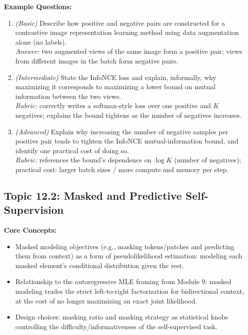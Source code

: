\documentclass[11pt]{article}
\begin{document}
\textbf{Example Questions:}
\begin{enumerate}
  \item \textit{(Basic)} Describe how positive and negative pairs are constructed for a contrastive image representation learning method using data augmentation alone (no labels). \\
  \textit{Answer:} two augmented views of the same image form a positive pair; views from different images in the batch form negative pairs.
  \item \textit{(Intermediate)} State the InfoNCE loss and explain, informally, why maximizing it corresponds to maximizing a lower bound on mutual information between the two views. \\
  \textit{Rubric:} correctly writes a softmax-style loss over one positive and $K$ negatives; explains the bound tightens as the number of negatives increases.
  \item \textit{(Advanced)} Explain why increasing the number of negative samples per positive pair tends to tighten the InfoNCE mutual-information bound, and identify one practical cost of doing so. \\
  \textit{Rubric:} references the bound's dependence on $\log K$ (number of negatives); practical cost: larger batch sizes / more compute and memory per step.
\end{enumerate}

\subsection{Topic 12.2: Masked and Predictive Self-Supervision}

\textbf{Core Concepts:}
\begin{itemize}
  \item Masked modeling objectives (e.g., masking tokens/patches and predicting them from context) as a form of pseudolikelihood estimation: modeling each masked element's conditional distribution given the rest.
  \item Relationship to the autoregressive MLE framing from Module 9: masked modeling trades the strict left-to-right factorization for bidirectional context, at the cost of no longer maximizing an exact joint likelihood.
  \item Design choices: masking ratio and masking strategy as statistical knobs controlling the difficulty/informativeness of the self-supervised task.
\end{itemize}
\end{document}
